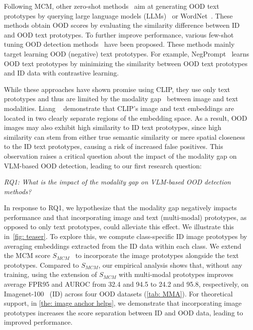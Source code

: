 Following MCM, other zero-shot methods~\cite{wang_clipn_2023,jiang2024negative,cao_envisioning_2024} aim at generating OOD text prototypes by querying large language models (LLMs)~\cite{khattab_colbert_2020,openai_gpt-4_2023} or WordNet~\cite{DBLP:journals/cacm/Miller95}. 
These methods obtain OOD scores by evaluating the similarity difference between ID and OOD text prototypes.
To further improve performance, various few-shot tuning OOD detection methods~\cite{liu_category-extensible_2023,li_learning_2024,zhang_lapt_2024,bai_id-like_2024,nie_out--distribution_2024} have been proposed. 
These methods mainly target learning OOD (negative) text prototypes. 
For example, NegPrompt~\cite{li_learning_2024} learns OOD text prototypes by minimizing the similarity between OOD text prototypes and ID data with contrastive learning.

While these approaches have shown promise using CLIP, they use only text prototypes and thus are limited by the modality gap~\cite{liang2022mind} between image and text modalities. 
Liang \etal~\cite{liang2022mind} demonstrate that CLIP’s image and text embeddings are located in two clearly separate regions of the embedding space.
As a result, OOD images may also exhibit high similarity to ID text prototypes, since high similarity can stem from either true semantic similarity or mere spatial closeness to the ID text prototypes, causing a risk of increased false positives. 
This observation raises a critical question about the impact of the modality gap on VLM-based OOD detection, leading to our first research question: 
    \begin{center}
        \textit{RQ1: What is the impact of the modality gap on VLM-based OOD detection methods?}
    \end{center}

In response to RQ1, we hypothesize that the modality gap negatively impacts performance and that incorporating image and text (multi-modal) prototypes, as opposed to only text prototypes, could alleviate this effect. We illustrate this in~\cref{fig: teaser}.
To explore this, we compute class-specific ID image prototypes by averaging embeddings extracted from the ID data 
within each class. 
We extend the MCM score $S_{\textit{MCM}}$~\cite{ming2022delving} to incorporate the image prototypes alongside the text prototypes. 
Compared to $S_{\textit{MCM}}$, our empirical analysis shows that, without any training, using the extension of $S_{\textit{MCM}}$ with multi-modal prototypes improves average FPR95 and AUROC from 32.4 and 94.5 to 24.2 and 95.8, respectively, on Imagenet-100~\cite{dengImageNetLargescaleHierarchical2009} (ID) across four OOD datasets (\cref{tab: MMA}).
For theoretical support, in \cref{the: image anchor helps}, we demonstrate that incorporating image prototypes increases the score separation between ID and OOD data, leading to improved performance. 

